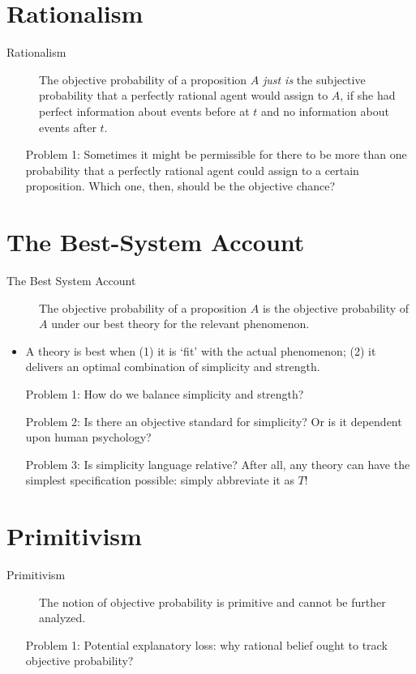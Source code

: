 \documentclass[11pt]{article}
\theoremstyle{definition}
\begin{document}
\section{Rationalism}
\begin{description}
\item[Rationalism] The objective probability of a proposition $A$ \textit{just is} the subjective probability that a perfectly rational agent would assign to $A$, if she had perfect information about events before at $t$ and no information about events after $t$.
\end{description}

\begin{enumerate}[leftmargin=4.5\parindent]
\item[Problem 1:] Sometimes it might be permissible for there to be more than one probability that a perfectly rational agent could assign to a certain proposition. Which one, then, should be the objective chance?
\end{enumerate}

\section{The Best-System Account}

\begin{description}
\item[The Best System Account] The objective probability of a proposition $A$ is the objective probability of $A$ under our best theory for the relevant phenomenon.
\end{description}

\begin{itemize}
\item A theory is best when (1) it is `fit' with the actual phenomenon; (2) it delivers an optimal combination of simplicity and strength.
\end{itemize}

\begin{enumerate}[leftmargin=4.5\parindent]
\item[Problem 1:] How do we balance simplicity and strength?
\item[Problem 2:] Is there an objective standard for simplicity? Or is it dependent upon human psychology?
\item[Problem 3:] Is simplicity language relative? After all, any theory can have the simplest specification possible: simply abbreviate it as $T$!
\end{enumerate}


\section{Primitivism}
\begin{description}
\item[Primitivism] The notion of objective probability is primitive and cannot be further analyzed.
\end{description}

\begin{enumerate}[leftmargin=4.5\parindent]
\item[Problem 1:] Potential explanatory loss: why rational belief ought to track objective probability?
\end{enumerate}
\end{document}
